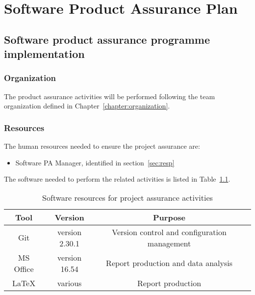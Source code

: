 \chapter{Software Product Assurance Plan}

\section{Software product assurance programme implementation}

\subsection{Organization}
\label{subsec:organization}

The product assurance activities will be performed following the team organization defined in Chapter~\ref{chapter:organization}.

\subsection{Resources}
The human resources needed to ensure the project assurance are:
\begin{itemize}
  \item Software PA Manager, identified in section~\ref{sec:resp}%
\end{itemize}

The software needed to perform the related activities is listed in Table~\ref{table:software_resources}.

\begin{table}[H]
\centering
\begin{tabular}{||c|c|c|c||}
 \hline
 \textbf{Tool} & \textbf{Version} & \textbf{Purpose}\\
 \hline
 Git & version 2.30.1 & Version control and configuration management \\
 MS Office & version 16.54 & Report production and data analysis \\
 LaTeX & various & Report production \\
 \hline
\end{tabular}
\caption{Software resources for project assurance activities}
\label{table:software_resources}
\end{table}

